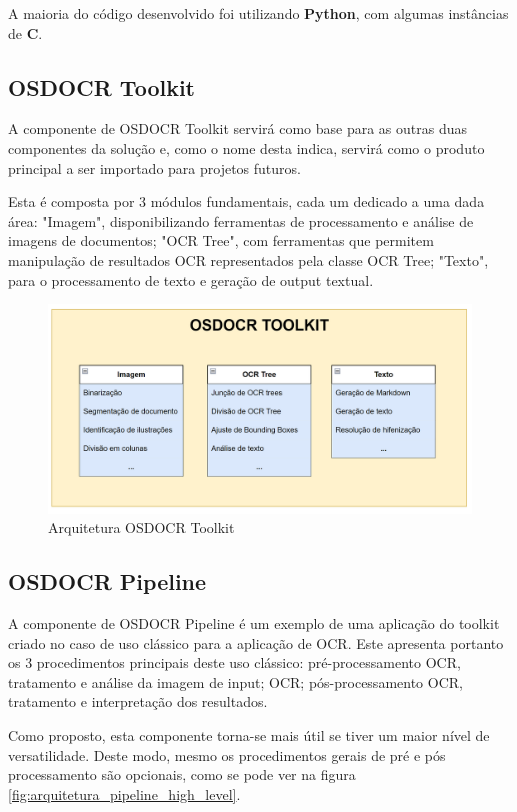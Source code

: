 A maioria do código desenvolvido foi utilizando \textbf{Python}, com algumas instâncias de \textbf{C}.

\subsection{OSDOCR Toolkit}


A componente de OSDOCR Toolkit servirá como base para as outras duas componentes da solução e, como o nome desta indica, servirá como o produto principal a ser importado para projetos futuros.

Esta é composta por 3 módulos fundamentais, cada um dedicado a uma dada área: "Imagem", disponibilizando ferramentas de processamento e análise de imagens de documentos; "OCR Tree", com ferramentas que permitem manipulação de resultados OCR representados pela classe OCR Tree; "Texto", para o processamento de texto e geração de output textual.

\begin{figure}[H]
	\centering
	\includegraphics[width=1\textwidth]{images/diagramas/arquitetura_toolkit.png}
	\caption{Arquitetura OSDOCR Toolkit}
	\label{fig:arquitetura_toolkit}
\end{figure}


\subsection{OSDOCR Pipeline}

A componente de OSDOCR Pipeline é um exemplo de uma aplicação do toolkit criado no caso de uso clássico para a aplicação de OCR. Este apresenta portanto os 3 procedimentos principais deste uso clássico: pré-processamento OCR, tratamento e análise da imagem de input; OCR; pós-processamento OCR, tratamento e interpretação dos resultados.

Como proposto, esta componente torna-se mais útil se tiver um maior nível de versatilidade. Deste modo, mesmo os procedimentos gerais de pré e pós processamento são opcionais, como se pode ver na figura \ref{fig:arquitetura_pipeline_high_level}.

